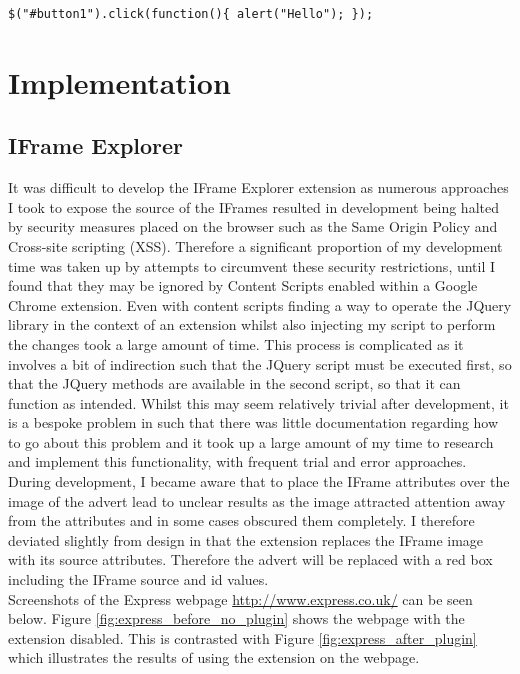\documentclass[12pt]{article}
\begin{document}
\begin{lstlisting}[caption=Setting the onClick functionality of button in JQuery, label={jqExample}]
$("#button1").click(function(){ alert("Hello"); });
\end{lstlisting}

\pagebreak

\section{Implementation} \label{implementation}

\subsection{IFrame Explorer}
It was difficult to develop the IFrame Explorer extension as numerous approaches I took to expose the source of the IFrames resulted in development being halted by security measures placed on the browser such as the Same Origin Policy and Cross-site scripting (XSS). Therefore a significant proportion of my development time was taken up by attempts to circumvent these security restrictions, until I found that they may be ignored by Content Scripts enabled within a Google Chrome extension. Even with content scripts finding a way to operate the JQuery library in the context of an extension whilst also injecting my script to perform the changes took a large amount of time. This process is complicated as it involves a bit of indirection such that the JQuery script must be executed first, so that the JQuery methods are available in the second script, so that it can function as intended. Whilst this may seem relatively trivial after development, it is a bespoke problem in such that there was little documentation regarding how to go about this problem and it took up a large amount of my time to research and implement this functionality, with frequent trial and error approaches. \\

During development, I became aware that to place the IFrame attributes over the image of the advert lead to unclear results as the image attracted attention away from the attributes and in some cases obscured them completely. I therefore deviated slightly from design in that the extension replaces the IFrame image with its source attributes. Therefore the advert will be replaced with a red box including the IFrame source and id values. \\

Screenshots of the Express webpage \url{http://www.express.co.uk/} can be seen below. Figure \ref{fig:express_before_no_plugin} shows the webpage with the extension disabled. This is contrasted with Figure \ref{fig:express_after_plugin} which illustrates the results of using the extension on the webpage. 
\end{document}
